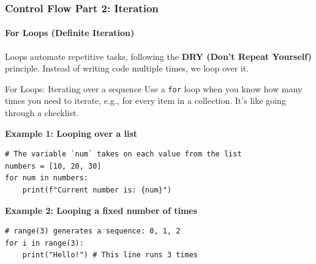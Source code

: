 \documentclass{beamer}
\begin{document}
\begin{frame}[fragile]
    \frametitle{Control Flow Part 2: Iteration}
    \framesubtitle{For Loops (Definite Iteration)}

    Loops automate repetitive tasks, following the \textbf{DRY (Don't Repeat Yourself)} principle. Instead of writing code multiple times, we loop over it.

    \begin{block}{For Loops: Iterating over a sequence}
        Use a \texttt{for} loop when you know how many times you need to iterate, e.g., for every item in a collection. It's like going through a checklist.
        \vspace{0.5em}
        
        \textbf{Example 1: Looping over a list}
        \begin{verbatim}
# The variable `num` takes on each value from the list
numbers = [10, 20, 30]
for num in numbers:
    print(f"Current number is: {num}")
        \end{verbatim}

        \textbf{Example 2: Looping a fixed number of times}
        \begin{verbatim}
# range(3) generates a sequence: 0, 1, 2
for i in range(3):
    print("Hello!") # This line runs 3 times
        \end{verbatim}
    \end{block}
\end{frame}
\end{document}
